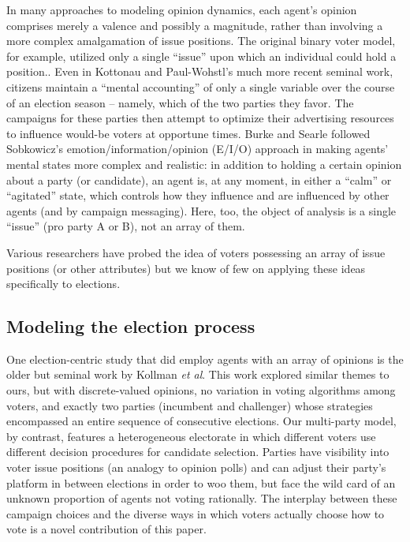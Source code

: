 In many approaches to modeling opinion dynamics, each agent's opinion comprises
merely a valence and possibly a magnitude, rather than involving a more complex
amalgamation of issue positions. The original binary voter model, for example,
utilized only a single ``issue'' upon which an individual could hold a
position.\cite{holley_ergodic_1975,clifford_model_1973}. Even in Kottonau and
Paul-Wohstl's much more recent seminal work\cite{kottonau_simulating_2004},
citizens maintain a ``mental accounting'' of only a single variable over the
course of an election season -- namely, which of the two parties they favor.
The campaigns for these parties then attempt to optimize their advertising
resources to influence would-be voters at opportune times. Burke and
Searle\cite{burke_quantitatively_2022} followed Sobkowicz's
emotion/information/opinion (E/I/O) approach\cite{sobkowicz_quantitative_2016}
in making agents' mental states more complex and realistic: in addition to
holding a certain opinion about a party (or candidate), an agent is, at any
moment, in either a ``calm'' or ``agitated'' state, which controls how they
influence and are influenced by other agents (and by campaign messaging). Here,
too, the object of analysis is a single ``issue'' (pro party A or B), not an
array of them.

Various researchers have probed the idea of voters possessing an array of issue
positions (or other
attributes)\cite{axelrod_dissemination_1997,fortunato_vector_2005,weisbuch_meet_2002,schweighofer_agent-based_2020,jung_cultural_2021,sirbu_opinion_2013, meyer_importance_2023}
but we know of few on applying these ideas specifically to elections.

\subsection{Modeling the election process}

One election-centric study that did employ agents with an array of opinions is
the older but seminal work by Kollman \textit{et
al}\cite{kollman_adaptive_1992}. This work explored similar themes to ours, but
with discrete-valued opinions, no variation in voting algorithms among voters,
and exactly two parties (incumbent and challenger) whose strategies encompassed
an entire sequence of consecutive elections. Our multi-party model, by
contrast, features a heterogeneous electorate in which different voters use
different decision procedures for candidate selection. Parties have visibility
into voter issue positions (an analogy to opinion polls) and can adjust their
party's platform in between elections in order to woo them, but face the wild
card of an unknown proportion of agents not voting rationally. The interplay
between these campaign choices and the diverse ways in which voters actually
choose how to vote is a novel contribution of this paper.

